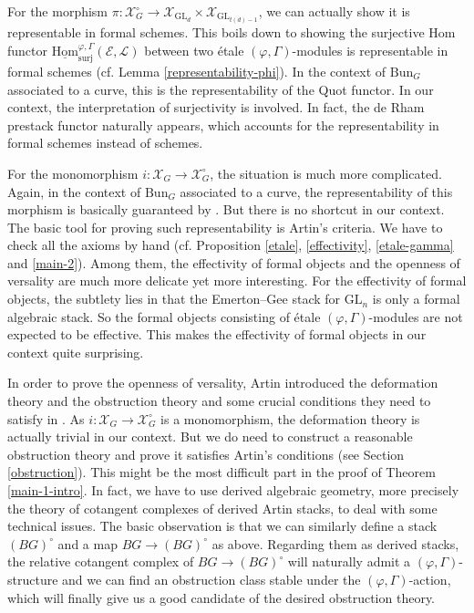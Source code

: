 \documentclass[10pt]{article}
\numberwithin{equation}{section}
\newcommand{\calE}{{\mathcal E}}
\newcommand{\calL}{{\mathcal L}}
\newcommand{\calX}{{\mathcal X}}
\newcommand{\Bun}{{\mathrm{Bun}}}           %
\newcommand{\Hom}{{\mathrm{Hom}}}           %
\newcommand{\GL}{{\mathrm{GL}}}             %
\newcommand{\surj}{\mathrm{surj}}
\begin{document}
For the morphism $\pi:\calX_G^{\circ}\to \calX_{\GL_d}\times \calX_{\GL_{t(d)-1}}$, we can actually show it is representable in formal schemes. This boils down to showing the surjective Hom functor $\underline\Hom^{\varphi,\Gamma}_{\surj}(\calE,\calL)$ between two \'etale $(\varphi,\Gamma)$-modules is representable in formal schemes (cf. Lemma \ref{representability-phi}). In the context of $\Bun_G$ associated to a curve, this is the representability of the Quot functor. In our context, the interpretation of surjectivity is involved. In fact, the de Rham prestack functor naturally appears, which accounts for the representability in formal schemes instead of schemes.

For the monomorphism $i:\calX_G\to \calX_G^{\circ}$, the situation is much more complicated. Again, in the context of $\Bun_G$ associated to a curve, the representability of this morphism is basically guaranteed by \cite{Ols06}. But there is no shortcut in our context. The basic tool for proving such representability is Artin's criteria. We have to check all the axioms by hand (cf. Proposition \ref{etale}, \ref{effectivity}, \ref{etale-gamma} and \ref{main-2}). Among them, the effectivity of formal objects and the openness of versality are much more delicate yet more interesting. For the effectivity of formal objects, the subtlety lies in that the Emerton--Gee stack for $\GL_n$ is only a formal algebraic stack. So the formal objects consisting of \'etale $(\varphi,\Gamma)$-modules are not expected to be effective. This makes the effectivity of formal objects in our context quite surprising.

In order to prove the openness of versality, Artin introduced the deformation theory and the obstruction theory and some crucial conditions they need to satisfy in \cite{Art74}. As $i:\calX_G\to \calX_G^{\circ}$ is a monomorphism, the deformation theory is actually trivial in our context. But we do need to construct a reasonable obstruction theory and prove it satisfies Artin's conditions (see Section \ref{obstruction}). This might be the most difficult  part in the proof of Theorem \ref{main-1-intro}. In fact, we have to use derived algebraic geometry, more precisely the theory of cotangent complexes of derived Artin stacks, to deal with some technical issues. The basic observation is that we can similarly define a stack $(BG)^{\circ}$ and a map $BG\to (BG)^{\circ}$ as above. Regarding them as derived stacks, the relative cotangent complex of $BG\to (BG)^{\circ}$ will naturally admit a $(\varphi,\Gamma)$-structure and we can find an obstruction class stable under the $(\varphi,\Gamma)$-action, which will finally give us a good candidate of the desired obstruction theory.
\end{document}
